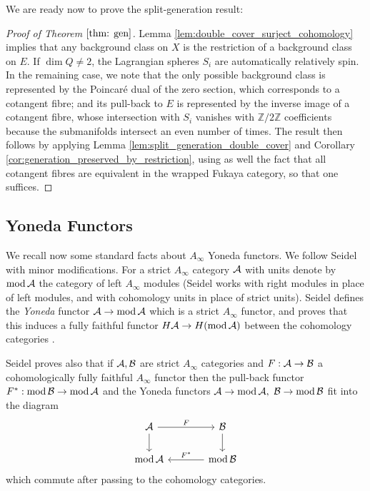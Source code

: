\documentclass{article}
\DeclareMathOperator{\Mod}{mod}\DeclareMathOperator{\supp}{supp}\DeclareMathOperator{\obj}{obj}
\theoremstyle{plain}%
\theoremstyle{definition}
\numberwithin{equation}{section}
\numberwithin{figure}{section}
\def\l{\label}
\def\cA{{\mathbin{\cal A}}}
\def\cB{{\mathbin{\cal B}}}
\def\Z{{\mathbin{\mathbb Z}}}
\def\iy{\infty}
\begin{document}
We are ready now to prove the split-generation result:
\begin{proof}[Proof of Theorem $\ref{thm: gen}$]
  Lemma \ref{lem:double_cover_surject_cohomology} implies that any background class on $X$ is the restriction of a background class on $E$. If $\dim Q \neq 2$, the Lagrangian spheres $S_i$ are automatically relatively spin. In the remaining case, we note that the only possible background class is represented by the Poincar\'e dual of the zero section, which corresponds to a cotangent fibre; and its pull-back to $E$ is represented by the inverse image of a cotangent fibre, whose intersection with $S_i$ vanishes with $\Z/2\Z$ coefficients because the submanifolds intersect an even number of times. The result then follows by applying Lemma \ref{lem:split_generation_double_cover} and Corollary \ref{cor:generation_preserved_by_restriction}, using as well the fact that all cotangent fibres are equivalent in the wrapped Fukaya category, so that one suffices.
\end{proof}


\subsection{Yoneda Functors}\l{sec: Yoneda}

We recall now some standard facts about $A_\iy$ Yoneda functors. We follow Seidel \cite{Seid3} with minor modifications.
For a strict $A_\iy$ category $\cA$ with units denote by $\Mod\cA$ the category of left $A_\iy$ modules (Seidel \cite[(2f)]{Seid3} works with right modules in place of left modules, and with cohomology units in place of strict units). 
Seidel \cite[(1l) and (2g)]{Seid3} defines the {\it Yoneda} functor $\cA\to\Mod\cA$ which is a strict $A_\iy$ functor, and proves that this induces a fully faithful functor $H\cA\to H(\Mod\cA)$ between the cohomology categories \cite[Corollary 2.13]{Seid3}. 
 
Seidel \cite[(2.13)]{Seid3} proves also that if $\cA,\cB$ are strict $A_\iy$ categories and $F:\cA\to\cB$ a cohomologically fully faithful $A_\iy$ functor then the pull-back functor $F^*:\Mod\cB\to\Mod\cA$ and the Yoneda functors $\cA\to \Mod\cA,$ $\cB\to\Mod\cB$ fit into the diagram
\begin{equation}\l{eq: Yoneda functorial}
\begin{tikzcd}  [column sep=large]
  \cA \ar[d] \ar[r,"F"]& \cB\ar[d]\\
 \Mod \cA &  \Mod\cB\ar[l,swap, "F^*"]
\end{tikzcd}
\end{equation}
which commute after passing to the cohomology categories.
 
\end{document}
